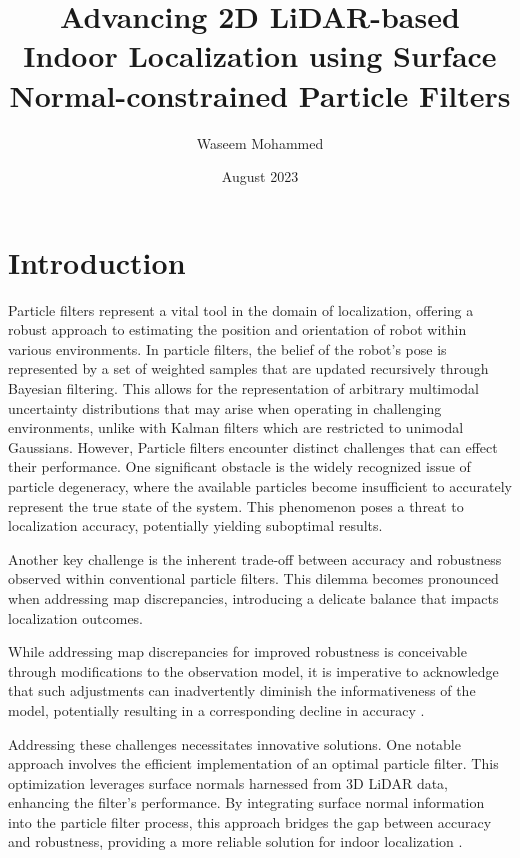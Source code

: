 \documentclass[rnd]{mas_proposal}
\title{Advancing 2D LiDAR-based Indoor Localization using Surface Normal-constrained Particle Filters}
\author{Waseem Mohammed}
\date{August 2023}
\begin{document}
\maketitle

\pagestyle{plain}

\section{Introduction}
Particle filters represent a vital tool in the domain of localization, offering a robust approach to estimating the position and orientation of robot within various environments. In particle filters, the belief of the robot’s pose is represented by a set of weighted samples that are updated recursively through Bayesian filtering. This allows for the representation of arbitrary multimodal uncertainty distributions that may arise when operating in challenging environments, unlike with Kalman filters which are restricted to unimodal Gaussians\cite{772544}. However, Particle filters encounter distinct challenges that can effect their performance. One significant obstacle is the widely recognized issue of particle degeneracy, where the available particles become insufficient to accurately represent the true state of the system. This phenomenon poses a threat to localization accuracy, potentially yielding suboptimal results.

Another key challenge is the inherent trade-off between accuracy and robustness observed within conventional particle filters. This dilemma becomes pronounced when addressing map discrepancies, introducing a delicate balance that impacts localization outcomes.  

While addressing map discrepancies for improved robustness is conceivable through modifications to the observation model, it is imperative to acknowledge that such adjustments can inadvertently diminish the informativeness of the model, potentially resulting in a corresponding decline in accuracy\cite{Markov_Localization} \cite{7759301}.

Addressing these challenges necessitates innovative solutions. One notable approach involves the efficient implementation of an optimal particle filter. This optimization leverages surface normals harnessed from 3D LiDAR data, enhancing the filter's performance. By integrating surface normal information into the particle filter process, this approach bridges the gap between accuracy and robustness, providing a more reliable solution for indoor localization \cite{10160274}.
\end{document}
